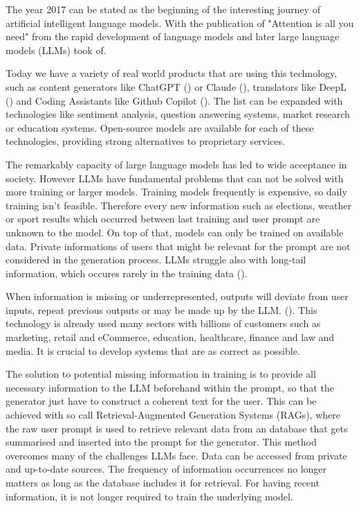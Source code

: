 The year 2017 can be stated as the beginning of the interesting journey of artificial intelligent language models. With the publication of "Attention is all you need" from \citet{vaswani2023attentionneed} the rapid development of language models and later large language models (LLMs) took of. 

Today we have a variety of real world products that are using this technology, such as content generators like ChatGPT (\citet{OpenAI_2022}) or Claude (\citet{Anthropic_2023}), translators like DeepL (\citet{DeepL_SE}) and Coding Assistants like Github Copilot (\citet{Friedman_2022}). The list can be expanded with technologies like sentiment analysis, question answering systems, market research or education systems. Open-source models are available for each of these technologies, providing strong alternatives to proprietary services.

The remarkably capacity of large language models has led to wide acceptance in society. However LLMs have fundamental problems that can not be solved with more training or larger models. Training models frequently is expensive, so daily training isn't feasible. Therefore every new information such as elections, weather or sport results which occurred between last training and user prompt are unknown to the model. On top of that, models can only be trained on available data. Private informations of users that might be relevant for the prompt are not considered in the generation process. LLMs struggle also with long-tail information, which occures rarely in the training data (\citet{Kandpal.15.11.2022}).

When information is missing or underrepresented, outputs will deviate from user inputs, repeat previous outputs or may be made up by the LLM. (\citet{Zhang.03.09.2023}). This technology is already used many sectors with billions of customers such as marketing, retail and eCommerce, education, healthcare, finance and law and media. It is crucial to develop systems that are as correct as possible.

The solution to potential missing information in training is to provide all necessary information to the LLM beforehand within the prompt, so that the generator just have to construct a coherent text for the user. This can be achieved with so call Retrieval-Augmented Generation Systems (RAGs), where the raw user prompt is used to retrieve relevant data from an database that gets summarised and inserted into the prompt for the generator. This method overcomes many of the challenges LLMs face. Data can be accessed from private and up-to-date sources. The frequency of information occurrences no longer matters as long as the database includes it for retrieval. For having recent information, it is not longer required to train the underlying model.

